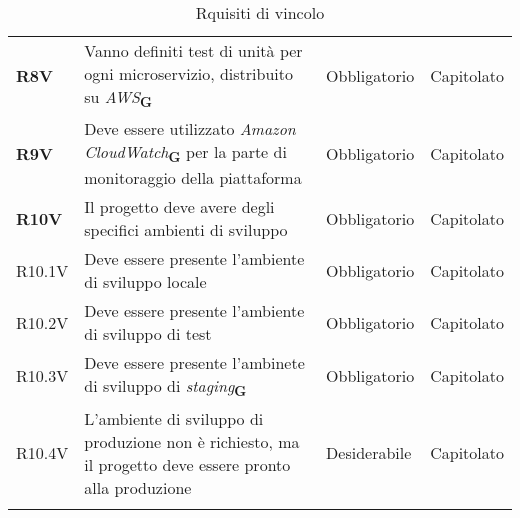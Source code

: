 \begin{center}
\begin{longtable}[!h]{p{50px} p{200px} p{100px} p{50px}}
        \textbf{R8V}                          & Vanno definiti test di unità per ogni microservizio, distribuito su \textit{AWS}\textsubscript{\textbf{G}}                                     & Obbligatorio             & Capitolato     \\
        \textbf{R9V}                          & Deve essere utilizzato \textit{Amazon CloudWatch}\textsubscript{\textbf{G}} per la parte di monitoraggio della piattaforma                     & Obbligatorio             & Capitolato     \\
        \textbf{R10V}                         & Il progetto deve avere degli specifici ambienti di sviluppo                                                                                    & Obbligatorio             & Capitolato     \\
        R10.1V                                & Deve essere presente l'ambiente di sviluppo locale                                                                                             & Obbligatorio             & Capitolato     \\
        R10.2V                                & Deve essere presente l'ambiente di sviluppo di test                                                                                            & Obbligatorio             & Capitolato     \\
        R10.3V                                & Deve essere presente l'ambinete di sviluppo di \textit{staging}\textsubscript{\textbf{G}}                                                      & Obbligatorio             & Capitolato     \\
        R10.4V                                & L'ambiente di sviluppo di produzione non è richiesto, ma il progetto deve essere pronto alla produzione                                        & Desiderabile             & Capitolato     \\
        \rowcolor{white}\caption{Rquisiti di vincolo}
    \end{longtable}
\end{center}

\newpage
